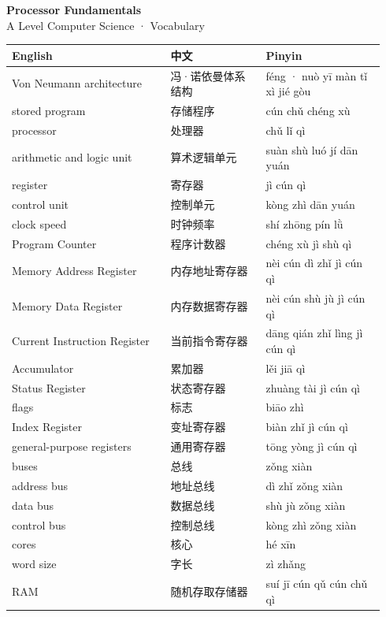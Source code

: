 \documentclass[11pt]{article}
\begin{document}
\begin{center}
  {\LARGE\bfseries Processor Fundamentals}\\[0.35em]
  {\large A Level Computer Science · Vocabulary}
\end{center}
\vspace{0.6em}

\begin{longtable}{@{}p{0.40\linewidth}p{0.24\linewidth}p{0.30\linewidth}@{}}
\toprule
\textbf{English} & \textbf{中文} & \textbf{Pinyin} \\
\midrule
\endhead
\bottomrule
\endlastfoot
Von Neumann architecture & 冯·诺依曼体系结构 & féng · nuò yī màn tǐ xì jié gòu \\
stored program & 存储程序 & cún chǔ chéng xù \\
processor & 处理器 & chǔ lǐ qì \\
arithmetic and logic unit & 算术逻辑单元 & suàn shù luó jí dān yuán \\
register & 寄存器 & jì cún qì \\
control unit & 控制单元 & kòng zhì dān yuán \\
clock speed & 时钟频率 & shí zhōng pín lǜ \\
Program Counter & 程序计数器 & chéng xù jì shù qì \\
Memory Address Register & 内存地址寄存器 & nèi cún dì zhǐ jì cún qì \\
Memory Data Register & 内存数据寄存器 & nèi cún shù jù jì cún qì \\
Current Instruction Register & 当前指令寄存器 & dāng qián zhǐ lìng jì cún qì \\
Accumulator & 累加器 & lěi jiā qì \\
Status Register & 状态寄存器 & zhuàng tài jì cún qì \\
flags & 标志 & biāo zhì \\
Index Register & 变址寄存器 & biàn zhǐ jì cún qì \\
general-purpose registers & 通用寄存器 & tōng yòng jì cún qì \\
buses & 总线 & zǒng xiàn \\
address bus & 地址总线 & dì zhǐ zǒng xiàn \\
data bus & 数据总线 & shù jù zǒng xiàn \\
control bus & 控制总线 & kòng zhì zǒng xiàn \\
cores & 核心 & hé xīn \\
word size & 字长 & zì zhǎng \\
RAM & 随机存取存储器 & suí jī cún qǔ cún chǔ qì \\

\end{longtable}
\end{document}
